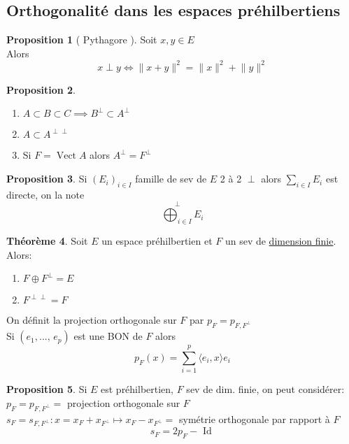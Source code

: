 \documentclass[10pt,a4paper]{article}
\theoremstyle{definition}
\newtheorem{proposition}{Proposition}[section]
\newtheorem{theorem}[proposition]{Théorème}
\DeclareMathOperator{\vect}{Vect}
\begin{document}
\subsection{Orthogonalité dans les espaces préhilbertiens}
\begin{proposition}[ Pythagore ]
    Soit \(x, y \in E\) \\
    Alors 
    \[x \perp y \iff \lVert x + y \rVert^2 = \lVert x \rVert^2 + \lVert y \rVert^2\]
\end{proposition}
\begin{proposition}
    \hfill
    \begin{enumerate}
        \item \(A \subset B \subset C \implies B^\perp \subset A^\perp\)
        \item \(A \subset A^{\perp \perp}\)
        \item Si \(F = \vect A\) alors \(A^\perp = F^\perp\)
    \end{enumerate}
\end{proposition}
\begin{proposition}
    Si \((E_i)_{i \in I}\) famille de sev de \(E\) 2 à 2 \(\perp\) alors \(\sum\limits_{i \in I} E_i\) est directe, on la note
    \[\overset{\perp}{\bigoplus_{i \in I}} E_i\]
\end{proposition}
\begin{theorem}
    Soit \(E\) un espace préhilbertien et \(F\) un sev de \uline{dimension finie}. \\
    Alors:
    \begin{enumerate}
        \item \(F \oplus F^\perp = E\)
        \item \(F^{\perp \perp} = F\)
    \end{enumerate}
    On définit la projection orthogonale sur \(F\) par  \(p_F = p_{F, F^\perp}\) \\
    Si \((e_1, ...,\, e_p)\) est une BON de \(F\) alors
    \[\boxed{p_F(x) = \sum_{i = 1}^{p} \langle e_i, x \rangle e_i}\]
\end{theorem}
\begin{proposition}
    Si \(E\) est préhilbertien, \(F\) sev de dim. finie, on peut considérer: \\
    \(p_F = p_{F, F^\perp} =\) projection orthogonale sur \(F\) \\
    \(s_F = s_{F, F^\perp}: x = x_F + x_{F^\perp} \mapsto x_F - x_{F^\perp} =\) symétrie orthogonale par rapport à \(F\)
    \[\boxed{s_F = 2p_F - \text{ Id }}\]
\end{proposition}
\end{document}
